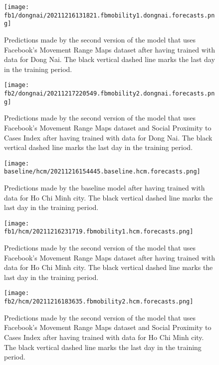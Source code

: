 \begin{figure}[!htb]
    \centering
    \texttt{[image: fb1/dongnai/20211216131821.fbmobility1.dongnai.forecasts.png]}
    \caption{Predictions made by the second version of the model that uses Facebook's Movement Range Maps dataset after having trained with data for Dong Nai. The black vertical dashed line marks the last day in the training period.}
    \label{fig:predictions-dongnai-fb1}
\end{figure}

\begin{figure}[!htb]
    \centering
    \texttt{[image: fb2/dongnai/20211217220549.fbmobility2.dongnai.forecasts.png]}
    \caption{Predictions made by the second version of the model that uses Facebook's Movement Range Maps dataset and Social Proximity to Cases Index after having trained with data for Dong Nai. The black vertical dashed line marks the last day in the training period.}
    \label{fig:predictions-dongnai-fb2}
\end{figure}


\begin{figure}[!htb]
    \centering
    \texttt{[image: baseline/hcm/20211216154445.baseline.hcm.forecasts.png]}
    \caption{Predictions made by the baseline model after having trained with data for Ho Chi Minh city. The black vertical dashed line marks the last day in the training period.}
    \label{fig:predictions-hcm-baseline}
\end{figure}

\begin{figure}[!htb]
    \centering
    \texttt{[image: fb1/hcm/20211216231719.fbmobility1.hcm.forecasts.png]}
    \caption{Predictions made by the second version of the model that uses Facebook's Movement Range Maps dataset after having trained with data for Ho Chi Minh city. The black vertical dashed line marks the last day in the training period.}
    \label{fig:predictions-hcm-fb1}
\end{figure}

\begin{figure}[!htb]
    \centering
    \texttt{[image: fb2/hcm/20211216183635.fbmobility2.hcm.forecasts.png]}
    \caption{Predictions made by the second version of the model that uses Facebook's Movement Range Maps dataset and Social Proximity to Cases Index after having trained with data for Ho Chi Minh city. The black vertical dashed line marks the last day in the training period.}
    \label{fig:predictions-hcm-fb2}
\end{figure}

